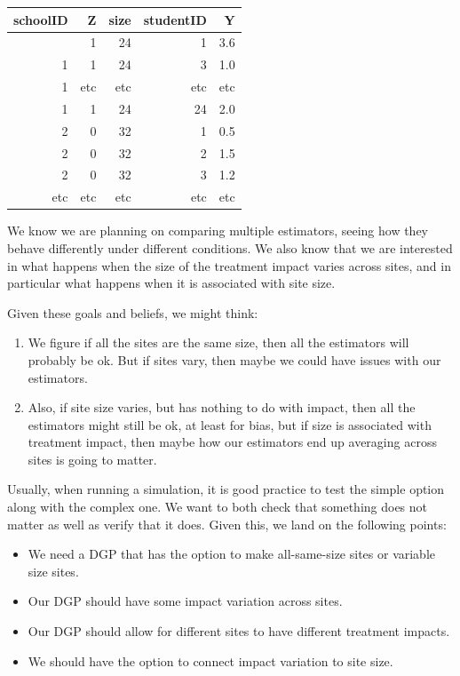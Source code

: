 \documentclass[
]{book}
\providecommand{\tightlist}{%
  \setlength{\itemsep}{0pt}\setlength{\parskip}{0pt}}
\begin{document}
\begin{longtable}[]{@{}rrrrr@{}}
\toprule\noalign{}
schoolID & Z & size & studentID & Y \\
\midrule\noalign{}
\endhead
\bottomrule\noalign{}
\endlastfoot
1 & 1 & 24 & 1 & 3.6 \\
1 & 1 & 24 & 3 & 1.0 \\
1 & etc & etc & etc & etc \\
1 & 1 & 24 & 24 & 2.0 \\
2 & 0 & 32 & 1 & 0.5 \\
2 & 0 & 32 & 2 & 1.5 \\
2 & 0 & 32 & 3 & 1.2 \\
etc & etc & etc & etc & etc \\
\end{longtable}

We know we are planning on comparing multiple estimators, seeing how they behave differently under different conditions.
We also know that we are interested in what happens when the size of the treatment impact varies across sites, and in particular what happens when it is associated with site size.

Given these goals and beliefs, we might think:

\begin{enumerate}
\def\labelenumi{\arabic{enumi})}
\tightlist
\item
  We figure if all the sites are the same size, then all the estimators will probably be ok. But if sites vary, then maybe we could have issues with our estimators.
\item
  Also, if site size varies, but has nothing to do with impact, then all the estimators might still be ok, at least for bias, but if size is associated with treatment impact, then maybe how our estimators end up averaging across sites is going to matter.
\end{enumerate}

Usually, when running a simulation, it is good practice to test the simple option along with the complex one.
We want to both check that something does not matter as well as verify that it does.
Given this, we land on the following points:

\begin{itemize}
\tightlist
\item
  We need a DGP that has the option to make all-same-size sites or variable size sites.
\item
  Our DGP should have some impact variation across sites.
\item
  Our DGP should allow for different sites to have different treatment impacts.
\item
  We should have the option to connect impact variation to site size.
\end{itemize}
\end{document}
